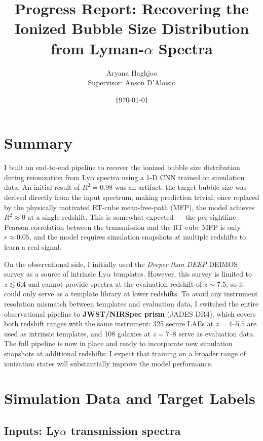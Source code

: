 \documentclass[11pt,a4paper]{article}
\title{\textbf{Progress Report: Recovering the Ionized Bubble Size Distribution\\
from Lyman-$\alpha$ Spectra}}
\author{Aryana Haghjoo\\
\small Supervisor: Anson D'Aloisio}
\date{\today}
\begin{document}
\maketitle

\section{Summary}

I built an end-to-end pipeline to recover the ionized bubble size
distribution during reionization from Ly$\alpha$ spectra using a 1-D CNN
trained on simulation data.
An initial result of $R^2 = 0.98$ was an artifact: the target bubble size
was derived directly from the input spectrum, making prediction trivial;
once replaced by the physically motivated RT-cube mean-free-path (MFP), the
model achieves $R^2 \approx 0$ at a single redshift.
This is somewhat expected — the per-sightline Pearson correlation between
the transmission and the RT-cube MFP is only $r \approx 0.05$, and the
model requires simulation snapshots at multiple redshifts to learn a real
signal.

On the observational side, I initially used the \textit{Deeper than DEEP}
DEIMOS survey as a source of intrinsic Ly$\alpha$ templates.
However, this survey is limited to $z \lesssim 6.4$ and cannot provide
spectra at the evaluation redshift of $z \sim 7.5$, so it could only serve
as a template library at lower redshifts.
To avoid any instrument resolution mismatch between templates and evaluation
data, I switched the entire observational pipeline to
\textbf{JWST/NIRSpec prism} (JADES DR4), which covers both redshift ranges
with the same instrument: 325 secure LAEs at $z = 4$--$5.5$ are used as
intrinsic templates, and 108 galaxies at $z = 7$--$8$ serve as evaluation
data.
The full pipeline is now in place and ready to incorporate new simulation
snapshots at additional redshifts; I expect that training on a broader
range of ionization states will substantially improve the model performance.

\section{Simulation Data and Target Labels}

\subsection{Inputs: Ly$\alpha$ transmission spectra}
\end{document}

